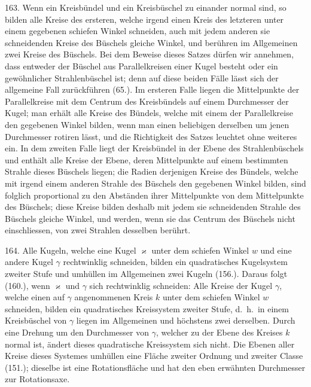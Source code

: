 163. Wenn ein Kreisb\"undel und ein Kreisb\"uschel zu
einander normal sind, so bilden alle Kreise des ersteren,
welche irgend einen Kreis des letzteren unter einem gegebenen
schiefen Winkel schneiden, auch mit jedem anderen
sie schneidenden Kreise des B\"uschels gleiche Winkel, und
ber\"uhren im Allgemeinen zwei Kreise des B\"uschels. Bei dem
Beweise dieses Satzes d\"urfen wir annehmen, dass entweder
der B\"uschel aus Parallelkreisen einer Kugel besteht oder ein
gew\"ohnlicher Strahlenb\"uschel ist; denn auf diese beiden F\"alle
l\"asst sich der allgemeine Fall zur\"uckf\"uhren (65.). Im ersteren
Falle liegen die Mittelpunkte der Parallelkreise mit dem Centrum
des Kreisb\"undels auf einem Durchmesser der Kugel; man
erh\"alt alle Kreise des B\"undels, welche mit einem der Parallelkreise
den gegebenen Winkel bilden, wenn man einen beliebigen
derselben um jenen Durchmesser rotiren l\"asst, und die Richtigkeit
des Satzes leuchtet ohne weiteres ein. In dem zweiten
Falle liegt der Kreisb\"undel in der Ebene des Strahlenb\"uschels
und enth\"alt alle Kreise der Ebene, deren Mittelpunkte auf
einem bestimmten Strahle dieses B\"uschels liegen; die Radien
derjenigen Kreise des B\"undels, welche mit irgend einem anderen
Strahle des B\"uschels den gegebenen Winkel bilden, sind
folglich proportional zu den Abst\"anden ihrer Mittelpunkte von
dem Mittelpunkte des B\"uschels; diese Kreise bilden deshalb
mit jedem sie schneidenden Strahle des B\"uschels gleiche
Winkel, und werden, wenn sie das Centrum des B\"uschels
nicht einschliessen, von zwei Strahlen desselben ber\"uhrt.

164. Alle Kugeln, welche eine Kugel $\varkappa$ unter dem schiefen
Winkel $w$ und eine andere Kugel $\gamma$ rechtwinklig schneiden,
bilden ein quadratisches Kugelsystem zweiter Stufe und umh\"ullen
im Allgemeinen zwei Kugeln (156.). Daraus folgt
(160.), wenn $\varkappa$ und $\gamma$ sich rechtwinklig schneiden: Alle Kreise
der Kugel $\gamma$, welche einen auf $\gamma$ angenommenen Kreis $k$
unter dem schiefen Winkel $w$ schneiden, bilden ein quadratisches
Kreissystem zweiter Stufe, d.~h.\ in einem Kreisb\"uschel
von $\gamma$ liegen im Allgemeinen und h\"ochstens zwei derselben.
Durch eine Drehung um den Durchmesser von $\gamma$, welcher zu der
Ebene des Kreises $k$ normal ist, \"andert dieses quadratische
Kreissystem sich nicht. Die Ebenen aller Kreise dieses
Systemes umh\"ullen eine Fl\"ache zweiter Ordnung und zweiter
Classe (151.); dieselbe ist eine Rotationsfl\"ache und hat den
eben erw\"ahnten Durchmesser zur Rotationsaxe.

